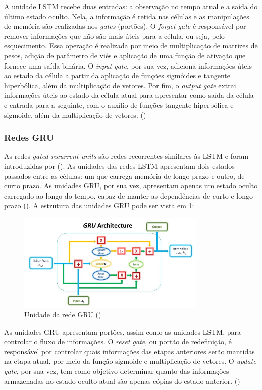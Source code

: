 A unidade LSTM recebe duas entradas: a observação no tempo atual e a saída do 
último estado oculto. Nela, a informação é retida nas células e as manipulações de memória 
são realizadas nos \textit{gates} (portões). O \textit{forget gate} é responsável
por remover informações que não são mais úteis para a célula, ou seja, pelo 
esquecimento. Essa operação é realizada por meio de multiplicação de matrizes 
de pesos, adição de parâmetro de viés e aplicação de uma função de ativação que fornece uma saída binária. 
O \textit{input gate}, por sua vez, adiciona informações úteis ao estado da célula
a partir da aplicação de funções sigmóides e tangente hiperbólica, além da multiplicação de vetores. 
Por fim, o \textit{output gate} extrai informações úteis ao estado da célula atual 
para apresentar como saída da célula e entrada para a seguinte, com o auxílio de funções tangente
hiperbólica e sigmoide, além da multiplicação de vetores. (\cite{deeplearningbook})

\subsubsection{Redes GRU}


As redes \textit{gated recurrent units} são redes recorrentes
similares às LSTM e foram introduzidas por (\cite{gru}).
As unidades
das redes LSTM apresentam dois estados passados entre as células:
um que carrega memória de longo prazo e outro, de curto prazo. As unidades 
GRU, por sua vez, apresentam apenas um 
estado oculto carregado ao longo do tempo, capaz de manter
as dependências de curto e longo prazo (\cite{deeplearningbook}). A 
estrutura das unidades GRU pode ser vista em \ref{fig:gru-cell}:

\begin{figure}[H]
  \centering
  \includegraphics[width=9cm]{../figuras/redes/gru-cell.png}
  \caption{Unidade da rede GRU (\cite{deeplearningbook})}
  \label{fig:gru-cell}
\end{figure}

As unidades GRU apresentam portões, assim como as unidades LSTM,
para controlar o fluxo de informações. O \textit{reset gate}, ou
portão de redefinição, é responsável por controlar quais informações 
das etapas anteriores serão mantidas na etapa atual, por meio 
da função sigmoide e multiplicação de vetores. O \textit{update gate},
por sua vez, tem como objetivo determinar quanto das informações
armazenadas no estado oculto atual são apenas cópias do estado anterior. (\cite{d2l})

